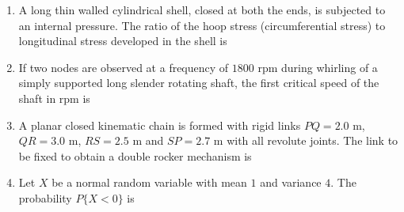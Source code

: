 \documentclass[journal]{IEEEtran}
\begin{document}
\begin{enumerate}[leftmargin=0pt]
\item A long thin walled cylindrical shell, closed at both the ends, is subjected to an internal pressure. The ratio of the hoop stress (circumferential stress) to longitudinal stress developed in the shell is
\begin{enumerate}
\end{enumerate}
\hfill{}




\item If two nodes are observed at a frequency of $1800$ rpm during whirling of a simply supported long slender rotating shaft, the first critical speed of the shaft in rpm is
\begin{enumerate}
\end{enumerate}
\hfill{}

\item A planar closed kinematic chain is formed with rigid links $PQ = 2.0$ m, $QR = 3.0$ m, $RS = 2.5$ m and $SP = 2.7$ m with all revolute joints. The link to be fixed to obtain a double rocker  mechanism is
\begin{enumerate}
\end{enumerate}
\hfill{}

\item Let $X$ be a normal random variable with mean $1$ and variance $4$. The probability $P\{X < 0\}$ is
\begin{enumerate}
\end{enumerate}
\hfill{}


\end{enumerate}
\end{document}
